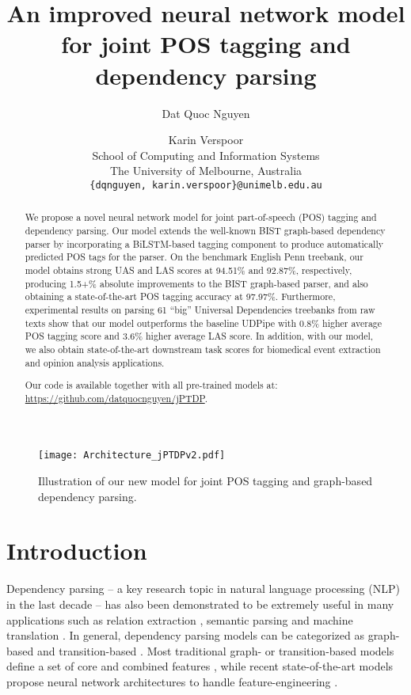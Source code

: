 \documentclass[11pt,letterpaper]{article}
\title{An improved neural network model for joint POS tagging and dependency parsing}
\author{Dat Quoc Nguyen \and Karin Verspoor  \\
School of Computing and Information Systems \\
The University of Melbourne, Australia \\
{\tt \{dqnguyen, karin.verspoor\}@unimelb.edu.au}
}
\date{}
\begin{document}
\maketitle

\begin{abstract}
We propose a novel neural network model for joint part-of-speech (POS) tagging and dependency parsing.  Our model  extends the well-known BIST graph-based dependency parser \citep{TACL885} by incorporating a BiLSTM-based tagging component to produce automatically predicted POS tags for the parser. 
On the benchmark English Penn treebank, our model obtains strong UAS and LAS scores at 94.51\% and 92.87\%, respectively, producing 1.5+\%  absolute improvements to the  BIST graph-based  parser, and also obtaining a state-of-the-art POS tagging accuracy at 97.97\%. Furthermore, 
experimental results on parsing 61 ``big'' Universal Dependencies treebanks  from raw texts show that our model outperforms the baseline UDPipe \citep{udpipe:2017}  with 0.8\% higher average POS tagging score and 3.6\% higher average LAS  score. 
In addition, with our model,  we also obtain state-of-the-art downstream task scores for biomedical event extraction and opinion analysis applications.   

Our code is available together with all pre-trained models  at: \url{https://github.com/datquocnguyen/jPTDP}.



\end{abstract}


\begin{figure*}[!t]
\centering
\texttt{[image: Architecture\_jPTDPv2.pdf]} 
\vspace{-10pt}
\caption{ Illustration of our new model for joint POS tagging and graph-based dependency parsing.}
\label{fig:Architecture}
\end{figure*}

\section{Introduction}

Dependency parsing -- a key research topic in natural language processing (NLP) in the last decade \cite{Buchholz2006,Nivre07,Kubler2009} -- has  also been demonstrated to be extremely useful in many applications such as relation extraction \citep{culotta-sorensen:2004:ACL,bunescu-mooney:2005:HLTEMNLP}, semantic parsing \citep{Q16-1010} and machine translation \citep{galley-manning:2009:ACLIJCNLP}. 
In general, dependency parsing models can be categorized as graph-based  
\cite{McDonald2005OLT} and transition-based  
\cite{Yamada2003,Nivre2003}.  
 Most traditional graph- or transition-based models define a set of core and combined features  \citep{E06-1011,Nivre2007,Bohnet2010,zhang-nivre:2011:ACL-HLT2011},  while recent state-of-the-art  models propose neural network architectures to handle feature-engineering
\citep{dyer-EtAl:2015:ACL-IJCNLP,TACL885,DozatM17,ma-hovy:2017:I17-1}. 
 
\end{document}
